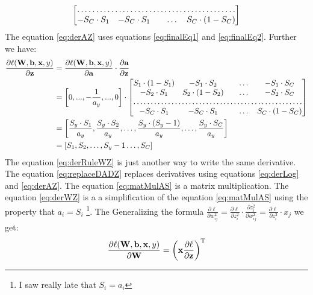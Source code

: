 \documentclass[10pt,a4paper]{article}
\begin{document}
\begin{enumerate}
\begin{align}
\begin{bmatrix}
    \hdotsfor{5} \\
        -S_C \cdot S_1    & 
-S_C \cdot S_1      &  & \dots & S_C \cdot (1 - S_C) \\
\end{bmatrix}\label{eq:derAZ}
\end{align}
The equation \ref{eq:derAZ} uses equations \ref{eq:finalEq1} and \ref{eq:finalEq2}.
Further we have:
\begin{align}
\frac{\partial \ell(\mat{W}, \vect{b}, \vect{x}, y)}{\partial \vect{z}} &=
\frac{\partial \ell (\mat{W}, \vect{b}, \vect{x}, y)}{\partial \vect{a}}
\cdot \frac{\partial \vect{a}}{\partial \vect{z}}
\label{eq:derRuleWZ}\\
&= \left[0, ..., -\frac{1}{a_y}, ..., 0\right] \cdot 
\begin{bmatrix}
    S_1 \cdot (1- S_1)    & 
-S_1 \cdot S_2      &  & \dots & -S_1\cdot S_C \\
- S_2 \cdot S_1    & 
S_2 \cdot (1 - S_2)      &  & \dots & -S_2 \cdot S_C \\
    \hdotsfor{5} \\
        -S_C \cdot S_1    & 
-S_C \cdot S_1      &  & \dots & S_C \cdot (1 - S_C) \\
\end{bmatrix} 
\label{eq:replaceDADZ}\\
&= \left[ \frac{S_y\cdot S_1 }{a_y},\frac{S_y \cdot S_2 }{a_y}, \dots, \frac{S_y \cdot (S_y - 1) }{a_y}, \dots, \frac{S_y \cdot S_C }{a_y}\right]
\label{eq:matMulAS}\\
&=  \left[ S_1 ,S_2, \dots, S_y - 1 \dots, S_C \right]
\label{eq:derWZ}
\end{align}
The equation \ref{eq:derRuleWZ} is just another way to write the same derivative. 
The equation \ref{eq:replaceDADZ} replaces derivatives using equations \ref{eq:derLog} and \ref{eq:derAZ}. The equation \ref{eq:matMulAS} is a matrix multiplication.  The equation \ref{eq:derWZ} is a a simplification of the equation \ref{eq:matMulAS} using the property that $a_i = S_i$ \footnote{I saw really late that $S_i = a_i$}. The Generalizing the formula $\frac { \partial \ell } { \partial w _ { i j } ^ { 2 } } = \frac { \partial \ell } { \partial z _ { i } ^ { 2 } } \cdot \frac { \partial z _ { i } ^ { 2 } } { \partial w _ { i j } ^ { 2 } } = \frac { \partial \ell } { \partial z _ { i } ^ { 2 } } \cdot x _ { j }$ we get:
\begin{align}
\frac{\partial \ell (\mat{W}, \vect{b}, \vect{x}, y)}{\partial \mat{W}} 
&=\transpose{\left( \vect{x} \frac{\partial \ell}{\partial \vect{z}}\right)} \nonumber \\

\end{align}
\end{enumerate}
\end{document}
